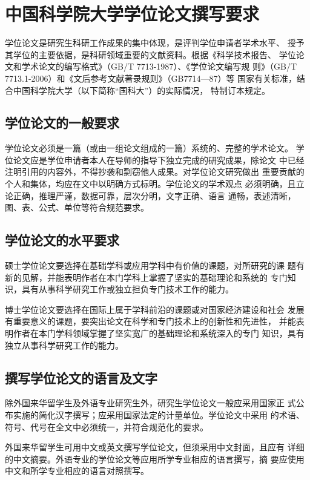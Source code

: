 
\chapter{中国科学院大学学位论文撰写要求}
学位论文是研究生科研工作成果的集中体现，是评判学位申请者学术水平、
授予其学位的主要依据，是科研领域重要的文献资料。根据《科学技术报告、
学位论文和学术论文的编写格式》（GB/T 7713-1987）、《学位论文编写规
则》（GB/T 7713.1-2006）和《文后参考文献著录规则》（GB7714—87）等
国家有关标准，结合中国科学院大学（以下简称“国科大”）的实际情况，
特制订本规定。

\section{学位论文的一般要求}

学位论文必须是一篇（或由一组论文组成的一篇）系统的、完整的学术论文。
学位论文应是学位申请者本人在导师的指导下独立完成的研究成果，除论文
中已经注明引用的内容外，不得抄袭和剽窃他人成果。对学位论文研究做出
重要贡献的个人和集体，均应在文中以明确方式标明。学位论文的学术观点
必须明确，且立论正确，推理严谨，数据可靠，层次分明，文字正确、语言
通畅，表述清晰，图、表、公式、单位等符合规范要求。

\section{学位论文的水平要求}

硕士学位论文要选择在基础学科或应用学科中有价值的课题，对所研究的课
题有新的见解，并能表明作者在本门学科上掌握了坚实的基础理论和系统的
专门知识，具有从事科学研究工作或独立担负专门技术工作的能力。

博士学位论文要选择在国际上属于学科前沿的课题或对国家经济建设和社会
发展有重要意义的课题，要突出论文在科学和专门技术上的创新性和先进性，
并能表明作者在本门学科领域掌握了坚实宽广的基础理论和系统深入的专门
知识，具有独立从事科学研究工作的能力。

\section{撰写学位论文的语言及文字}

除外国来华留学生及外语专业研究生外，研究生学位论文一般应采用国家正
式公布实施的简化汉字撰写；应采用国家法定的计量单位。学位论文中采用
的术语、符号、代号在全文中必须统一，并符合规范化的要求。

外国来华留学生可用中文或英文撰写学位论文，但须采用中文封面，且应有
详细的中文摘要。外语专业的学位论文等应用所学专业相应的语言撰写，摘
要应使用中文和所学专业相应的语言对照撰写。

